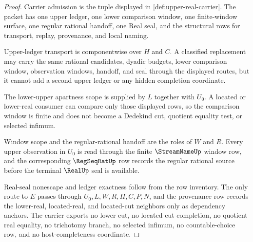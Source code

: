 \begin{proof}
Carrier admission is the tuple displayed in \autoref{def:upper-real-carrier}. The packet has one upper ledger, one lower comparison window, one finite-window surface, one regular rational handoff, one Real seal, and the structural rows for transport, replay, provenance, and local naming.

Upper-ledger transport is componentwise over $H$ and $C$. A classified replacement may carry the same rational candidates, dyadic budgets, lower comparison window, observation windows, handoff, and seal through the displayed routes, but it cannot add a second upper ledger or any hidden completion coordinate.

The lower-upper apartness scope is supplied by $L$ together with $U_0$. A located or lower-real consumer can compare only those displayed rows, so the comparison window is finite and does not become a Dedekind cut, quotient equality test, or selected infimum.

Window scope and the regular-rational handoff are the roles of $W$ and $R$. Every upper observation in $U_0$ is read through the finite $\StreamNameUp$ window row, and the corresponding $\RegSeqRatUp$ row records the regular rational source before the terminal $\RealUp$ seal is available.

Real-seal nonescape and ledger exactness follow from the row inventory. The only route to $E$ passes through $U_0,L,W,R,H,C,P,N$, and the provenance row records the lower-real, located-real, and located-cut neighbors only as dependency anchors. The carrier exports no lower cut, no located cut completion, no quotient real equality, no trichotomy branch, no selected infimum, no countable-choice row, and no host-completeness coordinate.
\end{proof}

